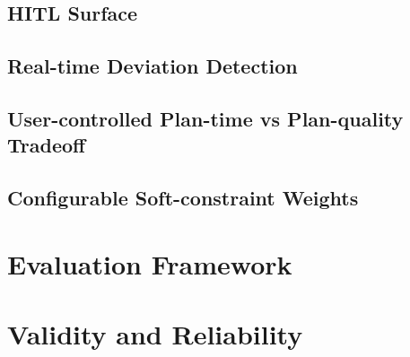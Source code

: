 \subsection{HITL Surface}
\label{sec:iter-hitl}

\subsection{Real-time Deviation Detection}
\label{sec:iter-deviations}

\subsection{User-controlled Plan-time vs Plan-quality Tradeoff}
\label{sec:iter-tradeoff}

\subsection{Configurable Soft-constraint Weights}
\label{sec:iter-weights}


\section{Evaluation Framework}
\label{sec:evaluation-framework}


\section{Validity and Reliability}
\label{sec:validity}

